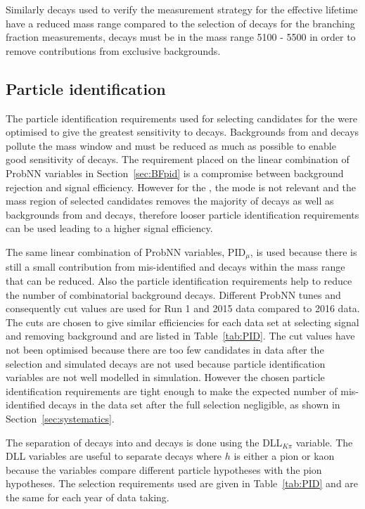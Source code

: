 Similarly \bhh decays used to verify the measurement strategy for the \bsmumu effective lifetime have a reduced mass range compared to the selection of \bhh decays for the branching fraction measurements, \bhh decays must be in the mass range 5100 - 5500 \mevcc in order to remove contributions from exclusive backgrounds.

\subsection{Particle identification}
\label{sec:ELpid}
The particle identification requirements used for selecting candidates for the \BFm were optimised to give the greatest sensitivity to \bdmumu decays. Backgrounds from \bhh and \lambdab decays pollute the \bd mass window and must be reduced as much as possible to enable good sensitivity of \bdmumu decays. The requirement placed on the linear combination of ProbNN variables in Section~\ref{sec:BFpid} is a compromise between background rejection and signal efficiency. However for the \elm, the \bd mode is not relevant and the mass region of selected candidates removes the majority of \bdmumu decays as well as backgrounds from \bhh and \lambdab decays, therefore looser particle identification requirements can be used leading to a higher signal efficiency.%

The same linear combination of ProbNN variables, PID$_{\mu}$, is used because there is still a small contribution from mis-identified \bhh and \lambdab decays within the mass range that can be reduced. Also the particle identification requirements help to reduce the number of combinatorial background decays. Different ProbNN tunes and consequently cut values are used for Run 1 and 2015 data compared to 2016 data. The cuts are chosen to give similar efficiencies for each data set at selecting signal and removing background and are listed in Table~\ref{tab:PID}. The cut values have not been optimised because there are too few candidates in data after the selection and simulated decays are not used because particle identification variables are not well modelled in simulation. However the chosen particle identification requirements are tight enough to make the expected number of mis-identified decays in the data set after the full selection negligible, as shown in Section~\ref{sec:systematics}. 

The separation of \bhh decays into \bskk and \bskpi decays is done using the DLL$_{K\pi}$ variable. The DLL variables are useful to separate \bhh decays where $h$ is either a pion or kaon because the variables compare different particle hypotheses with the pion hypotheses. The selection requirements used are given in Table~\ref{tab:PID} and are the same for each year of data taking.


